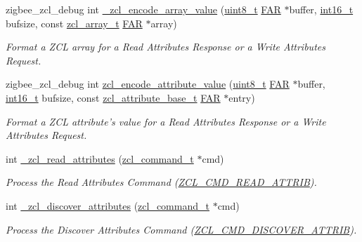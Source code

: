 \begin{DoxyCompactItemize}
zigbee\-\_\-zcl\-\_\-debug int \hyperlink{group__zcl_gaae79107724236347a5e22612869df2bf}{\-\_\-zcl\-\_\-encode\-\_\-array\-\_\-value} (\hyperlink{group__hal_gae1affc9ca37cfb624959c866a73f83c2}{uint8\-\_\-t} \hyperlink{group__hal_gaef060b3456fdcc093a7210a762d5f2ed}{F\-A\-R} $\ast$buffer, \hyperlink{group__hal_ga2140805d08462d474b82ddc8d1c2f3e6}{int16\-\_\-t} bufsize, const \hyperlink{structzcl__array__t}{zcl\-\_\-array\-\_\-t} \hyperlink{group__hal_gaef060b3456fdcc093a7210a762d5f2ed}{F\-A\-R} $\ast$array)
\begin{DoxyCompactList}\small\item\em Format a Z\-C\-L array for a Read Attributes Response or a Write Attributes Request. \end{DoxyCompactList}\item 
zigbee\-\_\-zcl\-\_\-debug int \hyperlink{group__zcl_gae3f7f58d3b08caf95aa11f90e3995397}{zcl\-\_\-encode\-\_\-attribute\-\_\-value} (\hyperlink{group__hal_gae1affc9ca37cfb624959c866a73f83c2}{uint8\-\_\-t} \hyperlink{group__hal_gaef060b3456fdcc093a7210a762d5f2ed}{F\-A\-R} $\ast$buffer, \hyperlink{group__hal_ga2140805d08462d474b82ddc8d1c2f3e6}{int16\-\_\-t} bufsize, const \hyperlink{structzcl__attribute__base__t}{zcl\-\_\-attribute\-\_\-base\-\_\-t} \hyperlink{group__hal_gaef060b3456fdcc093a7210a762d5f2ed}{F\-A\-R} $\ast$entry)
\begin{DoxyCompactList}\small\item\em Format a Z\-C\-L attribute's value for a Read Attributes Response or a Write Attributes Request. \end{DoxyCompactList}\item 
int \hyperlink{group__zcl_gaa34c917bf05a57503e63553efcb77dc9}{\-\_\-zcl\-\_\-read\-\_\-attributes} (\hyperlink{structzcl__command__t}{zcl\-\_\-command\-\_\-t} $\ast$cmd)
\begin{DoxyCompactList}\small\item\em Process the Read Attributes Command (\hyperlink{group__zcl_ga7a3d858b466e4202c6f2148a1b6a3eb2}{Z\-C\-L\-\_\-\-C\-M\-D\-\_\-\-R\-E\-A\-D\-\_\-\-A\-T\-T\-R\-I\-B}). \end{DoxyCompactList}\item 
int \hyperlink{group__zcl_ga385c41594437cdf661bfb518f11ee0fc}{\-\_\-zcl\-\_\-discover\-\_\-attributes} (\hyperlink{structzcl__command__t}{zcl\-\_\-command\-\_\-t} $\ast$cmd)
\begin{DoxyCompactList}\small\item\em Process the Discover Attributes Command (\hyperlink{group__zcl_ga2919d6fc8068efac4c9969938a4b9ff5}{Z\-C\-L\-\_\-\-C\-M\-D\-\_\-\-D\-I\-S\-C\-O\-V\-E\-R\-\_\-\-A\-T\-T\-R\-I\-B}). \end{DoxyCompactList}\item 

\end{DoxyCompactItemize}
